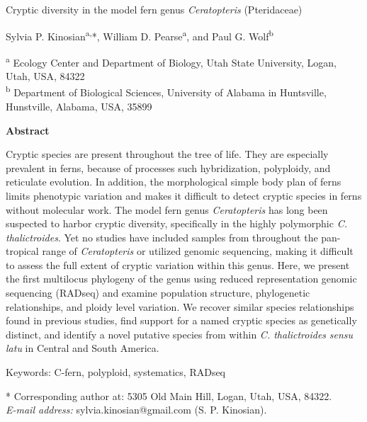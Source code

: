 \documentclass[12pt]{article}
\begin{document}
\begin{flushleft}
{\large{Cryptic diversity in the model fern genus \textit{Ceratopteris} (Pteridaceae)}}

Sylvia P. Kinosian\textsuperscript{a,}*, William D. Pearse\textsuperscript{a}, and Paul G. Wolf\textsuperscript{b}

{\small{\textsuperscript{a} Ecology Center and Department of Biology, Utah State University, Logan, Utah, USA, 84322\\
\textsuperscript{b} Department of Biological Sciences, University of Alabama in Huntsville, Hunstville, Alabama, USA, 35899}}

\textbf{Abstract}

Cryptic species are present throughout the tree of life. They are especially prevalent in ferns, because of processes such hybridization, polyploidy, and reticulate evolution. In addition, the morphological simple body plan of ferns limits phenotypic variation and makes it difficult to detect cryptic species in ferns without molecular work. The model fern genus \textit{Ceratopteris} has long been suspected to harbor cryptic diversity, specifically in the highly polymorphic \textit{C. thalictroides}. Yet no studies have included samples from throughout the pan-tropical range of \textit{Ceratopteris} or utilized genomic sequencing, making it difficult to assess the full extent of cryptic variation within this genus. Here, we present the first multilocus phylogeny of the genus using reduced representation genomic sequencing (RADseq) and examine population structure, phylogenetic relationships, and ploidy level variation. We recover similar species relationships found in previous studies, find support for a named cryptic species as genetically distinct, and identify a novel putative species
from within \textit{C. thalictroides} \textit{sensu latu} in Central and South America.

Keywords: C-fern, polyploid, systematics, RADseq

* Corresponding author at: 5305 Old Main Hill, Logan, Utah, USA, 84322. \\ \textit{E-mail address:} sylvia.kinosian@gmail.com (S. P. Kinosian).

\setlength{\parindent}{5ex}

\vspace{30cm}
\end{flushleft}
\end{document}
